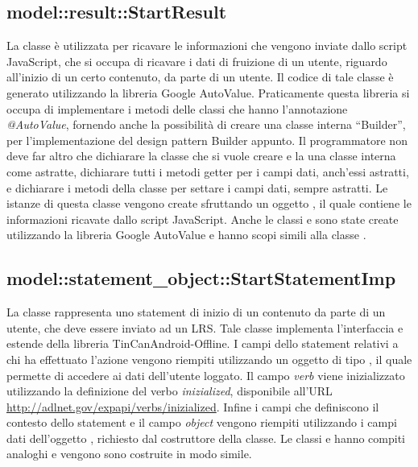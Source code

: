 \documentclass[../Tesi.tex]{subfiles}
\begin{document}
		\subsection{model::result::StartResult}
		La classe  è utilizzata per ricavare le informazioni che vengono inviate dallo script JavaScript, che si occupa di ricavare i dati di fruizione di un utente, riguardo all'inizio di un certo contenuto, da parte di un utente. Il codice di tale classe è generato utilizzando la libreria Google AutoValue. Praticamente questa libreria si occupa di implementare i metodi delle classi che hanno l'annotazione \textit{@AutoValue}, fornendo anche la possibilità di creare una classe interna ``Builder'', per l'implementazione del design pattern Builder appunto. Il programmatore non deve far altro che dichiarare la classe che si vuole creare e la una classe interna  come astratte, dichiarare tutti i metodi getter per i campi dati, anch'essi astratti, e dichiarare i metodi della classe  per settare i campi dati, sempre astratti. Le istanze di questa classe vengono create sfruttando un oggetto , il quale contiene le informazioni ricavate dallo script JavaScript. Anche le classi  e  sono state create utilizzando la libreria Google AutoValue e hanno scopi simili alla classe .

		\subsection{model::statement\_object::StartStatementImp}
		La classe  rappresenta uno statement di inizio di un contenuto da parte di un utente, che deve essere inviato ad un LRS. Tale classe implementa l'interfaccia  e estende  della libreria TinCanAndroid-Offline. I campi dello statement relativi a chi ha effettuato l'azione vengono riempiti utilizzando un oggetto di tipo , il quale permette di accedere ai dati dell'utente loggato. Il campo \textit{verb} viene inizializzato utilizzando la definizione del verbo \textit{inizialized}, disponibile all'URL \url{http://adlnet.gov/expapi/verbs/inizialized}. Infine i campi che definiscono il contesto dello statement e il campo \textit{object} vengono riempiti utilizzando i campi dati dell'oggetto , richiesto dal costruttore della classe. Le classi  e  hanno compiti analoghi e vengono sono costruite in modo simile.
\end{document}

